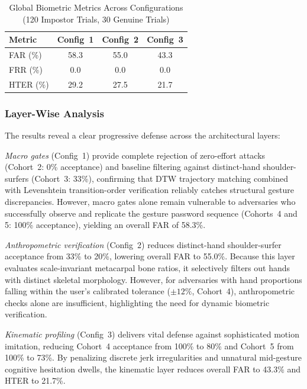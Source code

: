 \documentclass[conference]{IEEEtran}
\begin{document}
\begin{table}[h]
\centering
\caption{Global Biometric Metrics Across Configurations (120 Impostor Trials, 30 Genuine Trials)}
\label{tab:global_metrics}
\renewcommand{\arraystretch}{1.15}
\begin{tabular}{@{}l c c c@{}}
\toprule
\textbf{Metric} & \textbf{Config~1} & \textbf{Config~2} & \textbf{Config~3} \\
\midrule
FAR (\%) & 58.3 & 55.0 & 43.3 \\
FRR (\%) & 0.0 & 0.0 & 0.0 \\
HTER (\%) & 29.2 & 27.5 & 21.7 \\
\bottomrule
\end{tabular}
\end{table}

\subsubsection{Layer-Wise Analysis}
The results reveal a clear progressive defense across the architectural layers:

\textit{Macro gates} (Config~1) provide complete rejection of zero-effort attacks (Cohort~2: 0\% acceptance) and baseline filtering against distinct-hand shoulder-surfers (Cohort~3: 33\%), confirming that DTW trajectory matching combined with Levenshtein transition-order verification reliably catches structural gesture discrepancies. However, macro gates alone remain vulnerable to adversaries who successfully observe and replicate the gesture password sequence (Cohorts~4 and 5: 100\% acceptance), yielding an overall FAR of 58.3\%.

\textit{Anthropometric verification} (Config~2) reduces distinct-hand shoulder-surfer acceptance from 33\% to 20\%, lowering overall FAR to 55.0\%. Because this layer evaluates scale-invariant metacarpal bone ratios, it selectively filters out hands with distinct skeletal morphology. However, for adversaries with hand proportions falling within the user's calibrated tolerance ($\pm 12\%$, Cohort~4), anthropometric checks alone are insufficient, highlighting the need for dynamic biometric verification.

\textit{Kinematic profiling} (Config~3) delivers vital defense against sophisticated motion imitation, reducing Cohort~4 acceptance from 100\% to 80\% and Cohort~5 from 100\% to 73\%. By penalizing discrete jerk irregularities and unnatural mid-gesture cognitive hesitation dwells, the kinematic layer reduces overall FAR to 43.3\% and HTER to 21.7\%.
\end{document}
